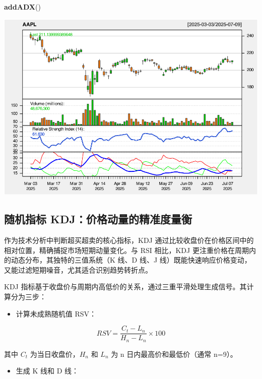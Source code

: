 \documentclass[]{ctexbook}
\newenvironment{Shaded}{\begin{snugshade}}{\end{snugshade}}
\newcommand{\FunctionTok}[1]{\textcolor[rgb]{0.13,0.29,0.53}{\textbf{#1}}}
\newcommand{\NormalTok}[1]{#1}
\providecommand{\tightlist}{%
  \setlength{\itemsep}{0pt}\setlength{\parskip}{0pt}}
\begin{document}
\begin{Shaded}
\begin{Highlighting}[]
\FunctionTok{addADX}\NormalTok{()}
\end{Highlighting}
\end{Shaded}

\includegraphics[width=0.9\linewidth]{quantmod_files/figure-latex/rsi_2-3}

\subsection{随机指标 KDJ：价格动量的精准度量衡}\label{ux968fux673aux6307ux6807-kdjux4ef7ux683cux52a8ux91cfux7684ux7cbeux51c6ux5ea6ux91cfux8861}

作为技术分析中判断超买超卖的核心指标，KDJ 通过比较收盘价在价格区间中的相对位置，精确捕捉市场短期动量变化。与 RSI 相比，KDJ 更注重价格在周期内的动态分布，其独特的三值系统（K 线、D 线、J 线）既能快速响应价格变动，又能过滤短期噪音，尤其适合识别趋势转折点。

KDJ 指标基于收盘价与周期内高低价的关系，通过三重平滑处理生成信号。其计算分为三步：

\begin{itemize}
\tightlist
\item
  计算未成熟随机值 RSV：
\end{itemize}

\[
RSV = \frac{C_t - L_n}{H_n - L_n} \times 100
\]

其中 \(C_t\) 为当日收盘价，\(H_n\) 和 \(L_n\) 为 n 日内最高价和最低价（通常 n=9）。

\begin{itemize}
\tightlist
\item
  生成 K 线和 D 线：
\end{itemize}
\end{document}

